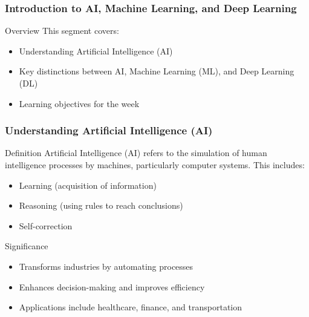 \documentclass[aspectratio=169]{beamer}
\begin{document}
\frame{\titlepage}

\begin{frame}[fragile]
    \titlepage
\end{frame}

\begin{frame}[fragile]
    \frametitle{Introduction to AI, Machine Learning, and Deep Learning}

    \begin{block}{Overview}
        This segment covers:
        \begin{itemize}
            \item Understanding Artificial Intelligence (AI)
            \item Key distinctions between AI, Machine Learning (ML), and Deep Learning (DL)
            \item Learning objectives for the week
        \end{itemize}
    \end{block}
\end{frame}

\begin{frame}[fragile]
    \frametitle{Understanding Artificial Intelligence (AI)}

    \begin{block}{Definition}
        Artificial Intelligence (AI) refers to the simulation of human intelligence processes by machines, particularly computer systems. This includes:
        \begin{itemize}
            \item Learning (acquisition of information)
            \item Reasoning (using rules to reach conclusions)
            \item Self-correction
        \end{itemize}
    \end{block}

    \begin{block}{Significance}
        \begin{itemize}
            \item Transforms industries by automating processes
            \item Enhances decision-making and improves efficiency
            \item Applications include healthcare, finance, and transportation
        \end{itemize}
    \end{block}
\end{frame}
\end{document}
